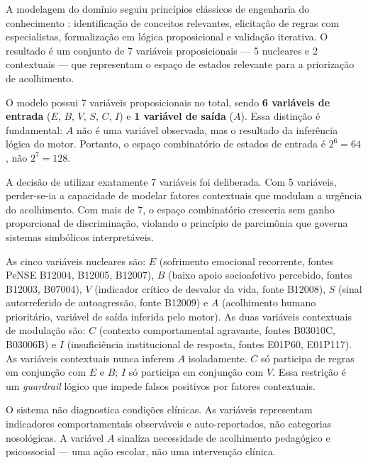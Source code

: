 \documentclass[
    12pt,
    openright,
    oneside,
    a4paper,
    english,
    brazil
]{abntex2}
\begin{document}
A modelagem do dom\'inio seguiu princ\'ipios cl\'assicos de engenharia do conhecimento \cite{brachman_levesque_2004}: identifica\c{c}\~ao de conceitos relevantes, elicita\c{c}\~ao de regras com especialistas, formaliza\c{c}\~ao em l\'ogica proposicional e valida\c{c}\~ao iterativa. O resultado \'e um conjunto de 7 vari\'aveis proposicionais --- 5 nucleares e 2 contextuais --- que representam o espa\c{c}o de estados relevante para a prioriza\c{c}\~ao de acolhimento.

O modelo possui 7 vari\'aveis proposicionais no total, sendo \textbf{6 vari\'aveis de entrada} ($E$, $B$, $V$, $S$, $C$, $I$) e \textbf{1 vari\'avel de sa\'ida} ($A$). Essa distin\c{c}\~ao \'e fundamental: $A$ n\~ao \'e uma vari\'avel observada, mas o resultado da infer\^encia l\'ogica do motor. Portanto, o espa\c{c}o combinat\'orio de estados de entrada \'e $2^6 = 64$, n\~ao $2^7 = 128$.

A decis\~ao de utilizar exatamente 7 vari\'aveis foi deliberada. Com 5 vari\'aveis, perder-se-ia a capacidade de modelar fatores contextuais que modulam a urg\^encia do acolhimento. Com mais de 7, o espa\c{c}o combinat\'orio cresceria sem ganho proporcional de discrimina\c{c}\~ao, violando o princ\'ipio de parcim\^onia que governa sistemas simb\'olicos interpret\'aveis.

As cinco vari\'aveis nucleares s\~ao: $E$ (sofrimento emocional recorrente, fontes PeNSE B12004, B12005, B12007), $B$ (baixo apoio socioafetivo percebido, fontes B12003, B07004), $V$ (indicador cr\'itico de desvalor da vida, fonte B12008), $S$ (sinal autorreferido de autoagress\~ao, fonte B12009) e $A$ (acolhimento humano priorit\'ario, vari\'avel de sa\'ida inferida pelo motor). As duas vari\'aveis contextuais de modula\c{c}\~ao s\~ao: $C$ (contexto comportamental agravante, fontes B03010C, B03006B) e $I$ (insufici\^encia institucional de resposta, fontes E01P60, E01P117). As vari\'aveis contextuais nunca inferem $A$ isoladamente. $C$ s\'o participa de regras em conjun\c{c}\~ao com $E$ e $B$; $I$ s\'o participa em conjun\c{c}\~ao com $V$. Essa restri\c{c}\~ao \'e um \textit{guardrail} l\'ogico que impede falsos positivos por fatores contextuais.

O sistema n\~ao diagnostica condi\c{c}\~oes cl\'inicas. As vari\'aveis representam indicadores comportamentais observ\'aveis e auto-reportados, n\~ao categorias nosol\'ogicas. A vari\'avel $A$ sinaliza necessidade de acolhimento pedag\'ogico e psicossocial --- uma a\c{c}\~ao escolar, n\~ao uma interven\c{c}\~ao cl\'inica.
\end{document}
